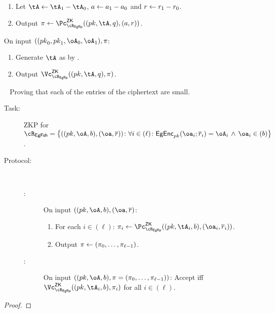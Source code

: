 \begin{description}
{\begin{description}
\begin{enumerate}
\begin{enumerate}
				\item    $\tA_j \asn  \sum_i  2^c \cdot (\oA_j)_i$. 
				\item    $r_j \asn  \sum_{i\in (\ell)}  2^c \cdot (\orr_j)_i$. 
				   
		\end{enumerate}
		
		\item Let $\tA \asn \tA_1 - \tA_0$, $a \leftarrow a_1 - a_0$ and $r \leftarrow r_1 - r_0$.
		\item  Output $\pi \asn \pZK{\rEgRp}((\pk,\tA,q), (a,r))$.
	\end{enumerate}
	
	
	\item[\Vc:]  On input $((\pk_0,\pk_1,\oA_0,\oA_1),\pi$: 
	
	\begin{enumerate}
		\item  Generate $\tA$ as by \Pc.
		
		\item  Output $\vZK{\rEgRp}((\pk,\tA,q), \pi)$.
		
	\end{enumerate}
\end{description}
}

\item[Freshness.]  ~
Proving that each of the entries of the  ciphertext are small. 

\begin{description}
	\item[Task:] ZKP for $\rtFsh =\rtFshDef$.

\item[Protocol:]~

\begin{description}	
	\item[\Pc:] On  input  $((\pk,\oA,b),(\oa,\orr)$:
	
	\begin{enumerate}
		\item For each $i\in (\ell)$: $\pi_i \asn \pZK{\rEgRp}((\pk,\tA_i,b), (\oa_i,\orr_i))$.
		\item Output $\pi \leftarrow (\pi_0,\ldots, \pi_{\ell-1})$.
	\end{enumerate}
	 
	 
	 	\item[\Vc:] On  input  $((\pk,\oA,b), \pi= (\pi_0,\ldots, \pi_{\ell-1}))$: Accept iff  $\vZK{\rEgRp}((\pk,\tA_i,b), \pi_i)$ for all $i\in (\ell)$.
	 
	 
\end{description}

\end{description}

\begin{proof}
\end{proof}
\end{description}


